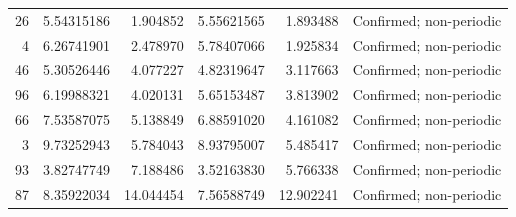 \begin{landscape}
\begin{longtable}{rrrrrl}
26 & 5.54315186 & 1.904852 & 5.55621565 & 1.893488 & Confirmed; non-periodic \\
4 & 6.26741901 & 2.478970 & 5.78407066 & 1.925834 & Confirmed; non-periodic \\
46 & 5.30526446 & 4.077227 & 4.82319647 & 3.117663 & Confirmed; non-periodic \\
96 & 6.19988321 & 4.020131 & 5.65153487 & 3.813902 & Confirmed; non-periodic \\
66 & 7.53587075 & 5.138849 & 6.88591020 & 4.161082 & Confirmed; non-periodic \\
3 & 9.73252943 & 5.784043 & 8.93795007 & 5.485417 & Confirmed; non-periodic \\
93 & 3.82747749 & 7.188486 & 3.52163830 & 5.766338 & Confirmed; non-periodic \\
87 & 8.35922034 & 14.044454 & 7.56588749 & 12.902241 & Confirmed; non-periodic \\
\end{longtable}
\endgroup
\end{landscape}
